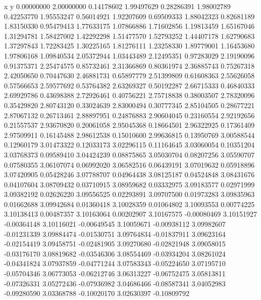 x y
0.00000000   2.00000000  
0.14178602   1.99497629  
0.28286391   1.98002789  
0.42253770   1.95553247  
0.56014921   1.92207609  
0.69509333   1.88042323  
0.82681189   1.83150330  
0.95479413   1.77633175  
1.07866886   1.71602856  
1.19813459   1.65167046  
1.31294781   1.58427002  
1.42292298   1.51477570  
1.52793252   1.44407178  
1.62790683   1.37297843  
1.72283425   1.30225165  
1.81276111   1.23258330  
1.89779001   1.16453680  
1.97806168   1.09840534  
2.05372944   1.03443489  
2.12495351   0.97283029  
2.19190096   0.91375371  
2.25474575   0.85732461  
2.31366869   0.80361974  
2.36885743   0.75267318  
2.42050650   0.70447630  
2.46881731   0.65897779  
2.51399809   0.61608363  
2.55626058   0.57566653  
2.59577692   0.53764382  
2.63269327   0.50192287  
2.66715333   0.46840333  
2.69929786   0.43698388  
2.72926461   0.40756221  
2.75718838   0.38003507  
2.78320096   0.35429820  
2.80743120   0.33024639  
2.83000494   0.30777345  
2.85104505   0.28677221  
2.87067132   0.26713461  
2.88897951   0.24876883  
2.90604045   0.23160554  
2.92192656   0.21557537  
2.93670820   0.20061058  
2.95045368   0.18664501  
2.96322925   0.17361409  
2.97509911   0.16145488  
2.98612538   0.15010600  
2.99636815   0.13950769  
3.00588544   0.12960179  
3.01473322   0.12033173  
3.02296115   0.11164645  
3.03060054   0.10351204  
3.03768373   0.09589410  
3.04424239   0.08875865  
3.05030704   0.08207256  
3.05590707   0.07580355  
3.06107074   0.06992020  
3.06582516   0.06439191  
3.07019632   0.05918896  
3.07420905   0.05428246  
3.07788707   0.04964438  
3.08125187   0.04524848  
3.08431676   0.04107604  
3.08709432   0.03710915  
3.08959682   0.03332975  
3.09183577   0.02971999  
3.09382192   0.02626220  
3.09556525   0.02293891  
3.09707500   0.01973283  
3.09835963   0.01662688  
3.09942684   0.01360418  
3.10028359   0.01064802  
3.10093553   0.00774225  
3.10138413   0.00487357  
3.10163064   0.00202907  
3.10167575   -0.00080469 
3.10151927   -0.00364148 
3.10116021   -0.00649545 
3.10059671   -0.00938112 
3.09982607   -0.01231339 
3.09884474   -0.01530751 
3.09764834   -0.01837911 
3.09623164   -0.02154419 
3.09458751   -0.02481905 
3.09270680   -0.02821948 
3.09058015   -0.03176170 
3.08819682   -0.03546306 
3.08554469   -0.03934204 
3.08261024   -0.04341824 
3.07937859   -0.04771244 
3.07583343   -0.05224650 
3.07195710   -0.05704346 
3.06773053   -0.06212746 
3.06313227   -0.06752475 
3.05813811   -0.07326331 
3.05272436   -0.07936982 
3.04686466   -0.08587341 
3.04052983   -0.09280590 
3.03368788   -0.10020170 
3.02630397   -0.10809792 
